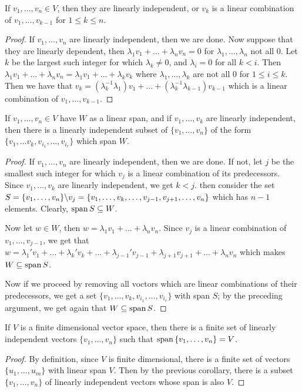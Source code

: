 \begin{theorem}\label{1.2.4}
    If $ v_1, \dots, v_n \in V$, then they are linearly independent, or $v_k$ is
    a linear combination of  $ v_1, \dots, v_{k-1}$ for $1 \leq k \leq n$.
\end{theorem}
\begin{proof}
    If $ v_1 ,\dots, v_n$ are linearly independent, then we are done. Now
    suppose that they are linearly dependent, then
    $\lambda_1v_1+\dots+\lambda_nv_n=0$ for $\lambda_1, \dots, \lambda_n$ not
    all $0$. Let  $k$ be the largest such integer for which  $\lambda_k \neq 0$,
    and  $\lambda_i=0$ for all  $k<i$. Then  $\lambda_1v_1+\dots+\lambda_nv_n=
    \lambda_1v_1+\dots+\lambda_kv_k$ where $\lambda_1, \dots, \lambda_k$ are not
    all $0$ for  $1 \leq i \leq k$. Then we have that
    $v_k=(\lambda_k^{-1}\lambda_1)v_1+\dots+(\lambda_k^{-1}\lambda_{k-1})v_{k-1}$
    which is a linear combination of $ v_1, \dots, v_{k-1}$.
\end{proof}
\begin{corollary}
    If $ v_1, \dots, v_n \in V$ have $W$ as a linear span, and if  $ v_1, \dots,
    v_k$ are linearly independent, then there is a linearly independent subset
    of $\{v_1, \dots, v_n\}$ of the form $\{v_1, \dots v_k,v_{i_1}, \dots,
    v_{i_r}\}$ which span $W$.
\end{corollary}
\begin{proof}
    If $ v_1, \dots, v_n$ are linearly independent, then we are done. If not,
    let $j$ be the smallest such integer for which  $v_j$ is a linear
    combination of its predecessors. Since  $ v_1, \dots, v_k$ are linearly
    independent, we get $k<j$. then consider the set  $S=\{v_1, \dots,
    v_n\} \backslash v_j=\{v_1, \dots, v_k, \dots, v_{j-1},v_{j+1}, \dots, v_n\}$ which
    has $n-1$ elements. Clearly,  $\operatorname{span}{S} \subseteq W$.

    Now let $w \in W$, then  $w=\lambda_1v_1+\dots+\lambda_nv_n$. Since $v_j$ is
    a linear combination of  $ v_1, \dots, v_{j-1}$, we get that
    $w=\lambda_1'v_1+\dots+\lambda_k'v_k+\dots+\lambda_{j-1}'v_{j-1}+\lambda_{j+1}v_{j+1}+\dots+\lambda_nv_n$
    which makes $W \subseteq \operatorname{span}{S}$.

    Now if we proceed by removing all voctors which are linear combinations of
    their predecessors, we get a set $\{v_1, \dots, v_k,v_{i_1}, \dots,
    v_{i_r}\}$ with span $S$; by the preceding argument, we get again that
    $W \subseteq \operatorname{span}{S}$.
\end{proof}
\begin{corollary}
    If $V$ is a finite dimensional vector space, then there is a finite set of
    linearly independent vectors  $\{v_1, \dots, v_n\}$ such that $\operatorname{span}{\{v_1,
    \dots, v_n\}}=V$.
\end{corollary}
\begin{proof}
    By definition, since $V$ is finite dimensional, there is a finite set of
    vectors  $\{u_1, \dots, u_m\}$ with linear span $V$. Then by the previous
    corollary, there is a subset  $\{v_1, \dots, v_n\}$ of linearly independent
    vectors whose span is also $V$.
\end{proof}

